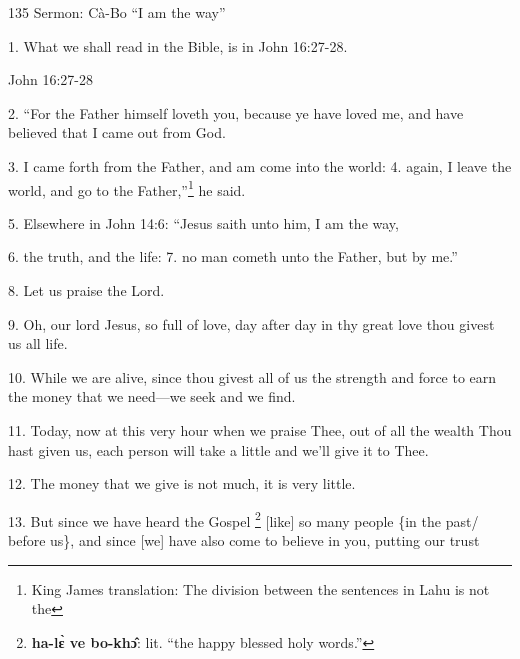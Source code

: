
135 Sermon: Cà-Bo ``I am the way''

1. What we shall read in the Bible, is in John 16:27-28.

John 16:27-28

2. ``For the Father himself loveth you, because ye have loved me, and have believed
that I came out from God.

3. I came forth from the Father, and am come into the world: 4. again, I leave
the world, and go to the Father,''\footnote{King James translation: The division between the sentences in Lahu is not the} he said.

5. Elsewhere in John 14:6: ``Jesus saith unto him, I am the way,

6. the truth, and the life: 7. no man cometh unto the Father, but by me.''

8. Let us praise the Lord.

9. Oh, our lord Jesus, so full of love, day after day in thy great love thou givest
us all life.

10. While we are alive, since thou givest all of us the strength and force to earn
the money that we need---we seek and we find.

11. Today, now at this very hour when we praise Thee, out of all the wealth Thou
hast given us, each person will take a little and we'll give it to Thee.

12. The money that we give is not much, it is very little.

13. But since we have heard the Gospel \footnote{\textbf{ha-lɛ̀ ve bo-khɔ̂}: lit. ``the happy blessed holy words.''} [like] so many people \{in the past/
before us\}, and since [we] have also come to believe in you, putting our trust
